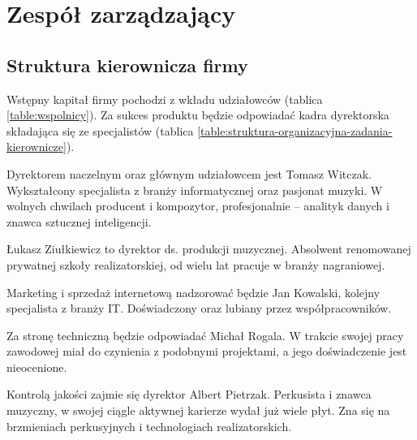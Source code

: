 \documentclass[12pt]{article}
\begin{document}
\section{Zespół zarządzający}


\subsection{Struktura kierownicza firmy}

Wstępny kapitał firmy pochodzi z wkładu udziałowców (tablica \ref{table:wspolnicy}).
Za sukces produktu będzie odpowiadać kadra dyrektorska składająca się ze specjalistów (tablica \ref{table:struktura-organizacyjna-zadania-kierownicze}).

Dyrektorem naczelnym oraz głównym udziałowcem jest Tomasz Witczak.
Wykształcony specjalista z branży informatycznej oraz pasjonat muzyki.
W wolnych chwilach producent i kompozytor, profesjonalnie -- analityk danych i znawca sztucznej inteligencji.

Łukasz Ziułkiewicz to dyrektor ds. produkcji muzycznej.
Absolwent renomowanej prywatnej szkoły realizatorskiej, od wielu lat pracuje w branży nagraniowej.

Marketing i sprzedaż internetową nadzorować będzie Jan Kowalski, kolejny specjalista z branży IT.
Doświadczony oraz lubiany przez współpracowników.

Za stronę techniczną będzie odpowiadać Michał Rogala.
W trakcie swojej pracy zawodowej miał do czynienia z podobnymi projektami, a jego doświadczenie jest nieocenione.

Kontrolą jakości zajmie się dyrektor Albert Pietrzak.
Perkusista i znawca muzyczny, w swojej ciągle aktywnej karierze wydał już wiele płyt.
Zna się na brzmieniach perkusyjnych i technologiach realizatorskich.

\begin{table}[h!]
    \begin{center}
            \caption{Wspólnicy i wnoszone wkłady}
            \label{table:wspolnicy}
    \end{center}
\end{table}
\end{document}
